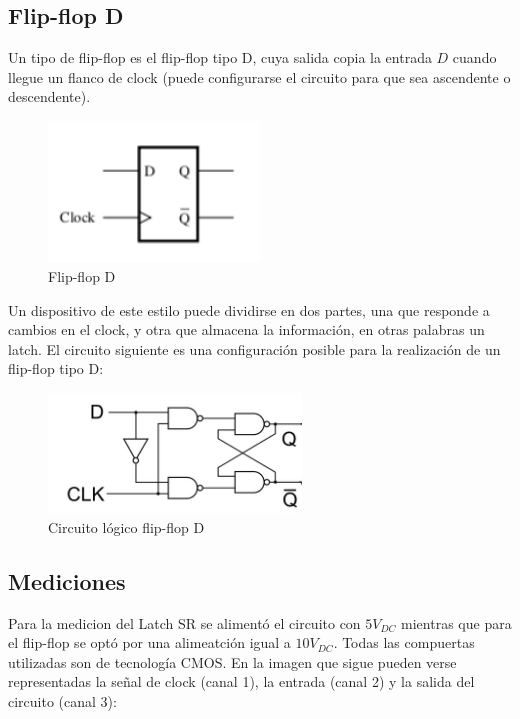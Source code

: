\subsection{Flip-flop D}
Un tipo de flip-flop es el flip-flop tipo D, cuya salida copia la entrada $D$ cuando llegue un flanco de clock (puede configurarse el circuito para que sea ascendente o descendente). 

\begin{figure}[H]
	\centering
	\includegraphics[width=0.5\textwidth]{Ejercicio6/Recursos/flipflopD}
	\caption{Flip-flop D}
\end{figure}

Un dispositivo de este estilo puede dividirse en dos partes, una que responde a cambios en el clock, y otra que almacena la información, en otras palabras un latch. El circuito siguiente es una configuración posible para la realización de un flip-flop tipo D:

\begin{figure}[H]
	\centering
	\includegraphics[width=0.6\textwidth]{Ejercicio6/Recursos/ffD_final}
	\caption{Circuito l\'ogico flip-flop D}
\end{figure}


\subsection{Mediciones}
Para la medicion del Latch SR se alimentó el circuito con $5V_{DC}$ mientras que para el flip-flop se optó por una alimeatción igual a $10V_{DC}$. Todas las compuertas utilizadas son de tecnología CMOS. En la imagen que sigue pueden verse representadas la señal de clock (canal 1), la entrada (canal 2) y la salida del circuito (canal 3):

